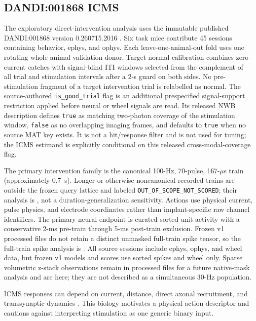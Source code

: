 \documentclass[11pt]{article}
\newcommand{\code}[1]{\texttt{#1}}
\begin{document}
\subsection{DANDI:001868 ICMS}

The exploratory direct-intervention analysis uses the immutable published
DANDI:001868 version 0.260715.2016
\citep{kim2026dandi001868,kim2026learning,kim2026acceptedrecord}. Six task mice contribute 45
sessions containing behavior, ephys, and ophys. Each leave-one-animal-out fold
uses one rotating whole-animal validation donor. Target normal calibration
combines zero-current catches with signal-blind ITI windows selected from the
complement of all trial and stimulation intervals after a 2-s guard on both
sides. No pre-stimulation fragment of a target intervention trial is
relabelled as normal.
The source-authored \code{is\_good\_trial} flag is an additional prespecified
signal-support restriction applied before neural or wheel signals are read.
Its released NWB description defines \code{true} as matching two-photon
coverage of the stimulation window, \code{false} as no overlapping imaging
frames, and defaults to \code{true} when no source MAT key exists. It is not a
hit/response filter and is not used for tuning; the ICMS estimand is explicitly
conditional on this released cross-modal-coverage flag.

The primary intervention family is the canonical 100-Hz, 70-pulse,
167-\(\mu\)s train (approximately 0.7~s). Longer or otherwise noncanonical
recorded trains are outside the frozen query lattice and labeled
\code{OUT\_OF\_SCOPE\_NOT\_SCORED}; their analysis is \NotEvaluated{}, not a
duration-generalization sensitivity. Actions use physical current, pulse
physics, and electrode coordinates rather than implant-specific raw channel
identifiers. The primary neural endpoint is curated sorted-unit activity with
a conservative 2-ms pre-train through 5-ms post-train exclusion. Frozen v1
processed files do not retain a distinct unmasked full-train spike tensor, so
the full-train spike analysis is \NotEvaluated{}. All source sessions include
ephys, ophys, and wheel data, but frozen v1 models and scores use sorted spikes
and wheel only. Sparse volumetric z-stack observations remain in processed
files for a future native-mask analysis and are \NotEvaluated{} here; they are
not described as a simultaneous 30-Hz population.

ICMS responses can depend on current, distance, direct axonal recruitment, and
transsynaptic dynamics
\citep{stoney1968extent,tehovnik2006direct,butovas2003spatiotemporal,
histed2009direct,lycke2023ultraflexible}. This biology motivates a physical
action descriptor and cautions against interpreting stimulation as one generic
binary input.
\end{document}
